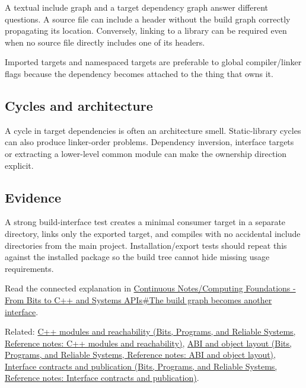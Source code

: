 A textual include graph and a target dependency graph answer different questions. A source file can include a header without the build graph correctly propagating its location. Conversely, linking to a library can be required even when no source file directly includes one of its headers.

Imported targets and namespaced targets are preferable to global compiler/linker flags because the dependency becomes attached to the thing that owns it.

\subsection{Cycles and architecture}\label{appendix-3327b8977adf-cycles-and-architecture}

A cycle in target dependencies is often an architecture smell. Static-library cycles can also produce linker-order problems. Dependency inversion, interface targets or extracting a lower-level common module can make the ownership direction explicit.

\subsection{Evidence}\label{appendix-3327b8977adf-evidence}

A strong build-interface test creates a minimal consumer target in a separate directory, links only the exported target, and compiles with no accidental include directories from the main project. Installation/export tests should repeat this against the installed package so the build tree cannot hide missing usage requirements.

Read the connected explanation in \hyperref[01-foundations-i-ch008-the-build-graph-becomes-another-interface]{Continuous Notes/Computing Foundations - From Bits to C++ and Systems APIs\#The build graph becomes another interface}.

Related: \href{../01-Bits-Programs-and-Reliable-Systems/main.pdf\#nameddest=appendix-410a611a5b8d}{C++ modules and reachability (Bits, Programs, and Reliable Systems, Reference notes: C++ modules and reachability)}, \href{../01-Bits-Programs-and-Reliable-Systems/main.pdf\#nameddest=appendix-c4ac6bb0fff8}{ABI and object layout (Bits, Programs, and Reliable Systems, Reference notes: ABI and object layout)}, \href{../01-Bits-Programs-and-Reliable-Systems/main.pdf\#nameddest=appendix-fdae7ff0a23f}{Interface contracts and publication (Bits, Programs, and Reliable Systems, Reference notes: Interface contracts and publication)}.
